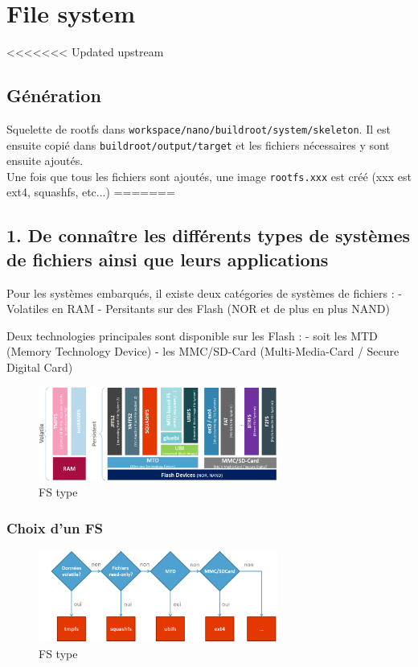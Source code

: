 \documentclass[resume]{subfiles}
\begin{document}
\section{File system}
<<<<<<< Updated upstream
\subsection{Génération}
Squelette de rootfs dans \verb!workspace/nano/buildroot/system/skeleton!. Il est ensuite copié dans \verb!buildroot/output/target! et les fichiers nécessaires y sont ensuite ajoutés.\\
Une fois que tous les fichiers sont ajoutés, une image \verb!rootfs.xxx! est créé (xxx est ext4, squashfs, etc...)
=======

\subsection{}

\subsection{1. De connaître les différents types de systèmes de fichiers ainsi que leurs applications}

Pour les systèmes embarqués, il existe deux catégories de systèmes de fichiers :
- Volatiles en RAM
- Persitants sur des Flash (NOR et de plus en plus NAND)

Deux technologies principales sont disponible sur les Flash :  
- soit les MTD (Memory Technology Device)
- les MMC/SD-Card (Multi-Media-Card / Secure Digital Card)

\begin{figure}[H]
    \centering
    \includegraphics[width=0.7\textwidth]{Figures/fileSystem/fileSystemType.PNG}
    \caption{FS type}
    \label{fig:fileSystemType}
\end{figure}

\subsubsection{Choix d'un FS}
\begin{figure}[H]
    \centering
    \includegraphics[width=0.7\textwidth]{Figures/fileSystem/fileSystemChoice.PNG}
    \caption{FS type}
    \label{fig:fileSystemChoice}
\end{figure}
\end{document}
